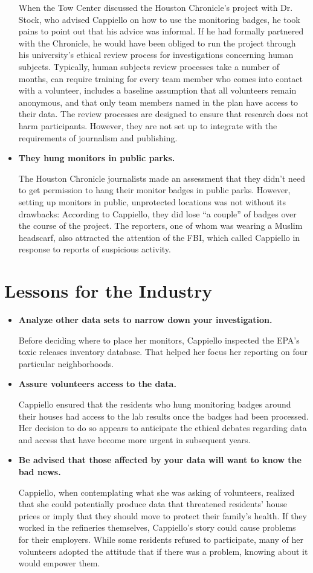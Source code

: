 \begin{itemize}
When the Tow Center discussed the Houston Chronicle's project
with Dr. Stock, who advised Cappiello on how to use the monitoring
badges, he took pains to point out that his advice was informal.
If he had formally partnered with the Chronicle, he would have been
obliged to run the project through his university's ethical review process
for investigations concerning human subjects. Typically, human
subjects review processes take a number of months, can require training
for every team member who comes into contact with a volunteer,
includes a baseline assumption that all volunteers remain anonymous,
and that only team members named in the plan have access to their
data. The review processes are designed to ensure that research does
not harm participants. However, they are not set up to integrate with
the requirements of journalism and publishing.
\item \textbf{They hung monitors in public parks.}

The Houston Chronicle journalists made an assessment that they
didn't need to get permission to hang their monitor badges in public
parks. However, setting up monitors in public, unprotected locations
was not without its drawbacks: According to Cappiello, they did lose
``a couple'' of badges over the course of the project. The reporters,
one of whom was wearing a Muslim headscarf, also attracted the
attention of the FBI, which called Cappiello in response to reports of
suspicious activity.
\end{itemize}

\section{Lessons for the Industry}
\begin{itemize}
\item \textbf{Analyze other data sets to narrow down your investigation.}

Before deciding where to place her monitors, Cappiello inspected the
EPA's toxic releases inventory database. That helped her focus her
reporting on four particular neighborhoods.
\item \textbf{Assure volunteers access to the data.}

Cappiello ensured that the residents who hung monitoring badges
around their houses had access to the lab results once the badges had
been processed. Her decision to do so appears to anticipate the ethical
debates regarding data and access that have become more urgent
in subsequent years.
\item \textbf{Be advised that those affected by your data will want to know
the bad news.}

Cappiello, when contemplating what she was asking of volunteers,
realized that she could potentially produce data that threatened residents'
house prices or imply that they should move to protect their
family's health. If they worked in the refineries themselves, Cappiello's
story could cause problems for their employers. While some residents
refused to participate, many of her volunteers adopted the attitude
that if there was a problem, knowing about it would empower them.
\end{itemize}

